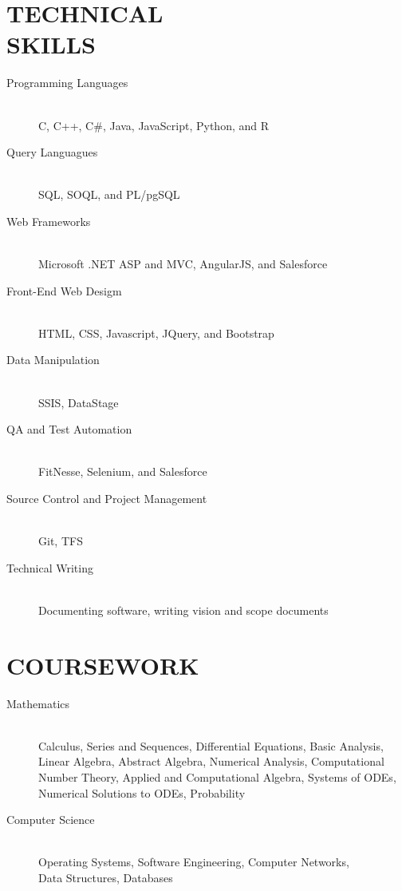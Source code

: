 \documentclass[margin]{res}
\begin{document}
\begin{resume}
 
\section{TECHNICAL \\ SKILLS} 
                \begin{description}
                  \item[Programming Languages] \hfill \\
                  C, C++, C\#, Java, JavaScript, Python, and R 
                  \item[Query Languagues] \hfill \\
                  SQL, SOQL, and PL/pgSQL 
                  \item[Web Frameworks] \hfill \\
                  Microsoft .NET ASP and MVC, AngularJS, and Salesforce 
                  \item[Front-End Web Desigm] \hfill \\
                  HTML, CSS, Javascript, JQuery, and Bootstrap
                  \item[Data Manipulation] \hfill \\
                  SSIS, DataStage
                  \item[QA and Test Automation] \hfill \\
                  FitNesse, Selenium, and Salesforce
                  \item[Source Control and Project Management] \hfill \\
                  Git, TFS
                  \item[Technical Writing] \hfill \\
                  Documenting software, writing vision and scope documents 
                \end{description}
                    
                
\section{COURSEWORK}
    \begin{description}
                  \item[Mathematics] \hfill \\
                  Calculus, Series and Sequences, Differential Equations, Basic Analysis, \\ Linear Algebra, Abstract Algebra, Numerical Analysis, Computational Number Theory, Applied and Computational Algebra, Systems of ODEs, Numerical Solutions to ODEs, Probability
                  \item[Computer Science] \hfill \\
                  Operating Systems, Software Engineering, Computer Networks, \\ Data Structures, Databases
                  
                \end{description}

\end{resume}
\end{document}
